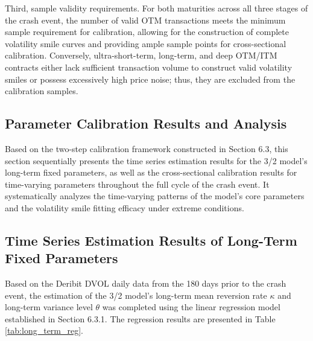 Third, sample validity requirements. For both maturities across all three stages of the crash event, the number of valid OTM transactions meets the minimum sample requirement for calibration, allowing for the construction of complete volatility smile curves and providing ample sample points for cross-sectional calibration. Conversely, ultra-short-term, long-term, and deep OTM/ITM contracts either lack sufficient transaction volume to construct valid volatility smiles or possess excessively high price noise; thus, they are excluded from the calibration samples.

\subsection{Parameter Calibration Results and Analysis}

Based on the two-step calibration framework constructed in Section 6.3, this section sequentially presents the time series estimation results for the 3/2 model's long-term fixed parameters, as well as the cross-sectional calibration results for time-varying parameters throughout the full cycle of the crash event. It systematically analyzes the time-varying patterns of the model's core parameters and the volatility smile fitting efficacy under extreme conditions.

\subsection{Time Series Estimation Results of Long-Term Fixed Parameters}

Based on the Deribit DVOL daily data from the 180 days prior to the crash event, the estimation of the 3/2 model's long-term mean reversion rate $\kappa$ and long-term variance level $\theta$ was completed using the linear regression model established in Section 6.3.1. The regression results are presented in Table \ref{tab:long_term_reg}.

